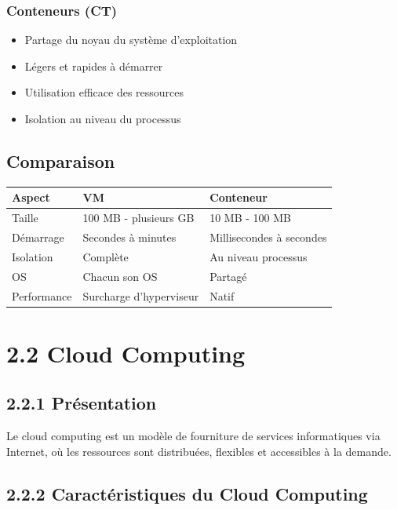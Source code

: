 \documentclass[12pt,a4paper]{report}
\begin{document}
\subsubsection{Conteneurs (CT)}

\begin{itemize}
    \item Partage du noyau du système d'exploitation
    \item Légers et rapides à démarrer
    \item Utilisation efficace des ressources
    \item Isolation au niveau du processus
\end{itemize}

\subsection{Comparaison}

\begin{table}[h]
\centering
\begin{tabular}{|l|l|l|}
\hline
\textbf{Aspect} & \textbf{VM} & \textbf{Conteneur} \\
\hline
Taille & 100 MB - plusieurs GB & 10 MB - 100 MB \\
Démarrage & Secondes à minutes & Millisecondes à secondes \\
Isolation & Complète & Au niveau processus \\
OS & Chacun son OS & Partagé \\
Performance & Surcharge d'hyperviseur & Natif \\
\hline
\end{tabular}
\end{table}

\section{2.2 Cloud Computing}

\subsection{2.2.1 Présentation}

Le cloud computing est un modèle de fourniture de services informatiques via Internet, où les ressources sont distribuées, flexibles et accessibles à la demande.

\subsection{2.2.2 Caractéristiques du Cloud Computing}
\end{document}
